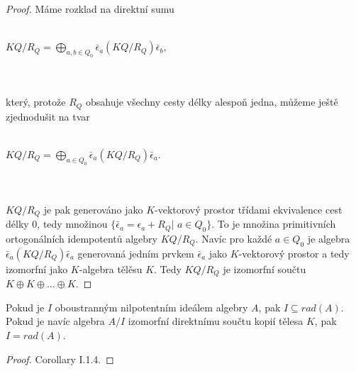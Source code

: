     \begin{proof}
      Máme rozklad na direktní sumu \\\\
      \centerline{$KQ/R_Q=\bigoplus_{a,b\in Q_0}\bar\epsilon_a(KQ/R_Q)\bar\epsilon_b$,}\\\\
      který, protože $R_Q$ obsahuje všechny cesty délky alespoň jedna, můžeme 
      ještě zjednodušit na tvar\\\\
      \centerline{$KQ/R_Q=\bigoplus_{a\in Q_0}\bar\epsilon_a(KQ/R_Q)\bar\epsilon_a$.}\\\\
      $KQ/R_Q$ je pak generováno jako $K$-vektorový prostor třídami ekvivalence 
      cest délky 0, tedy množinou $\{\bar\epsilon_a=\epsilon_a+R_Q|$ $a\in 
      Q_0\}$. To je množina primitivních ortogonálních idempotentů algebry 
      $KQ/R_Q$. Navíc pro každé $a\in Q_0$ je algebra $\bar\epsilon_a(KQ/R_Q)\bar\epsilon_a$ 
      generovaná jedním prvkem $\bar\epsilon_a$ jako $K$-vektorový prostor a 
      tedy izomorfní jako $K$-algebra  tělěsu $K$. Tedy $KQ/R_Q$ je izomorfní 
      součtu $K\oplus K\oplus\ldots\oplus K$.
    \end{proof}
            
    \begin{lem}\label{lem-nilpotent-je-radikal}
      Pokud je $I$ oboustranným nilpotentním ideálem algebry $A$, pak $I\subseteq rad(A)$. 
      Pokud je navíc algebra $A/I$ izomorfní direktnímu součtu kopií tělesa $K$, pak $I=rad(A)$. 
    \end{lem} 
    
    \begin{proof}
      \cite{1} Corollary I.1.4.
    \end{proof}
    
